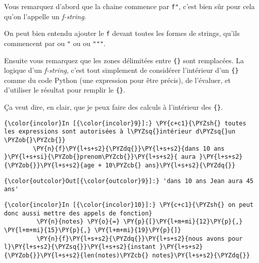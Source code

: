     Vous remarquez d'abord que la chaine commence par \texttt{f"}, c'est
bien sûr pour cela qu'on l'appelle un \emph{f-string}.

On peut bien entendu ajouter le \texttt{f} devant toutes les formes de
strings, qu'ils commencent par \texttt{\textquotesingle{}} ou \texttt{"}
ou \texttt{\textquotesingle{}\textquotesingle{}\textquotesingle{}} ou
\texttt{"""}.

    Ensuite vous remarquez que les zones délimitées entre \texttt{\{\}} sont
remplacées. La logique d'un \emph{f-string}, c'est tout simplement de
considérer l'intérieur d'un \texttt{\{\}} comme du code Python (une
expression pour être précis), de l'évaluer, et d'utiliser le résultat
pour remplir le \texttt{\{\}}.

    Ça veut dire, en clair, que je peux faire des calculs à l'intérieur des
\texttt{\{\}}.

    \begin{Verbatim}[commandchars=\\\{\},frame=single,framerule=0.3mm,rulecolor=\color{cellframecolor}]
{\color{incolor}In [{\color{incolor}9}]:} \PY{c+c1}{\PYZsh{} toutes les expressions sont autorisées à l\PYZsq{}intérieur d\PYZsq{}un \PYZob{}\PYZcb{}}
        \PY{n}{f}\PY{l+s+s2}{\PYZdq{}}\PY{l+s+s2}{dans 10 ans }\PY{l+s+si}{\PYZob{}prenom\PYZcb{}}\PY{l+s+s2}{ aura }\PY{l+s+s2}{\PYZob{}}\PY{l+s+s2}{age + 10\PYZcb{} ans}\PY{l+s+s2}{\PYZdq{}}
\end{Verbatim}


\begin{Verbatim}[commandchars=\\\{\},frame=single,framerule=0.3mm,rulecolor=\color{cellframecolor}]
{\color{outcolor}Out[{\color{outcolor}9}]:} 'dans 10 ans Jean aura 45 ans'
\end{Verbatim}
            
    \begin{Verbatim}[commandchars=\\\{\},frame=single,framerule=0.3mm,rulecolor=\color{cellframecolor}]
{\color{incolor}In [{\color{incolor}10}]:} \PY{c+c1}{\PYZsh{} on peut donc aussi mettre des appels de fonction}
         \PY{n}{notes} \PY{o}{=} \PY{p}{[}\PY{l+m+mi}{12}\PY{p}{,} \PY{l+m+mi}{15}\PY{p}{,} \PY{l+m+mi}{19}\PY{p}{]}
         \PY{n}{f}\PY{l+s+s2}{\PYZdq{}}\PY{l+s+s2}{nous avons pour l}\PY{l+s+s2}{\PYZsq{}}\PY{l+s+s2}{instant }\PY{l+s+s2}{\PYZob{}}\PY{l+s+s2}{len(notes)\PYZcb{} notes}\PY{l+s+s2}{\PYZdq{}}
\end{Verbatim}


